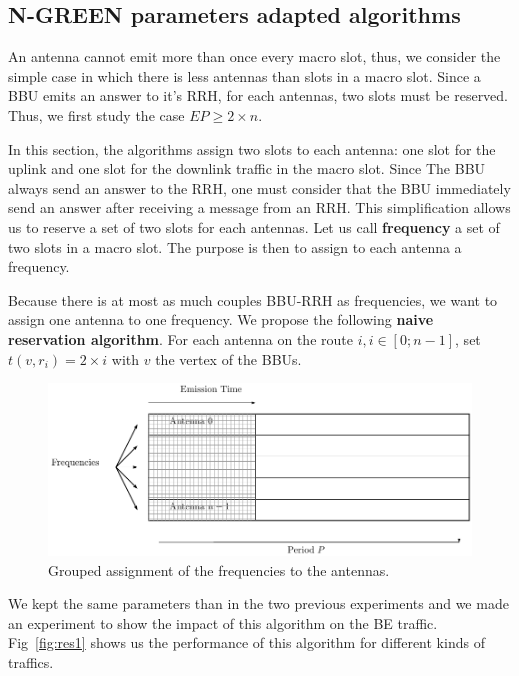 \documentclass[a4paper,10pt,french,english]{article}
\begin{document}
\subsection{N-GREEN parameters adapted algorithms}
An antenna cannot emit more than once every macro slot, thus, we consider the simple case in which there is less antennas than slots in a macro slot. Since a BBU emits an answer to it's RRH, for each antennas, two slots must be reserved. Thus, we first study the case $EP \ge 2\times n$. 

 In this section, the algorithms assign two slots to each antenna: one slot for the uplink and one slot for the downlink traffic in the macro slot. Since The BBU always send an answer to the RRH, one must consider that the BBU immediately send an answer after receiving a message from an RRH. This simplification allows us to reserve a set of two slots for each antennas. Let us call {\bf frequency} a set of two slots in a macro slot. The purpose is then to assign to each antenna a frequency.
 
 Because there is at most as much couples BBU-RRH as frequencies, we want to assign one antenna to one frequency.
We propose the following {\bf naive reservation algorithm}. For each antenna on the route $i, i\in [0;n-1] $, set $t(v,r_i)= 2\times i$ with $v$ the vertex of the BBUs. 
   \begin{figure}[h]

      \includegraphics[scale=0.7]{freqgrouped.pdf}
     \caption{Grouped assignment of the frequencies to the antennas.}   \label{fig:freqG}
  \end{figure}


We kept the same parameters than in the two previous experiments and we made an experiment to show the impact of this algorithm on the BE traffic. Fig~\ref{fig:res1} shows us the performance of this algorithm for different kinds of traffics. 
\end{document}
